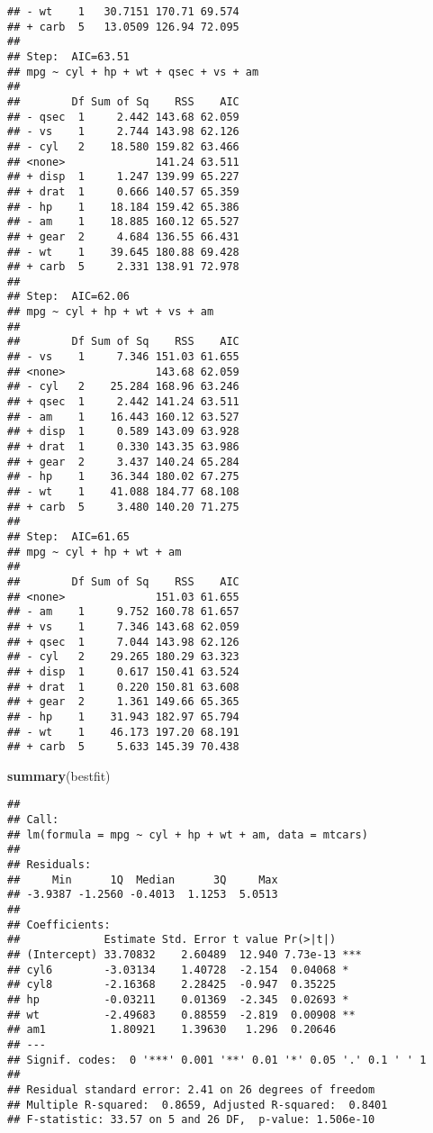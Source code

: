 \documentclass[
]{article}
\newenvironment{Shaded}{\begin{snugshade}}{\end{snugshade}}
\newcommand{\KeywordTok}[1]{\textcolor[rgb]{0.13,0.29,0.53}{\textbf{#1}}}
\newcommand{\NormalTok}[1]{#1}
\begin{document}
\begin{verbatim}
## - wt    1   30.7151 170.71 69.574
## + carb  5   13.0509 126.94 72.095
## 
## Step:  AIC=63.51
## mpg ~ cyl + hp + wt + qsec + vs + am
## 
##        Df Sum of Sq    RSS    AIC
## - qsec  1     2.442 143.68 62.059
## - vs    1     2.744 143.98 62.126
## - cyl   2    18.580 159.82 63.466
## <none>              141.24 63.511
## + disp  1     1.247 139.99 65.227
## + drat  1     0.666 140.57 65.359
## - hp    1    18.184 159.42 65.386
## - am    1    18.885 160.12 65.527
## + gear  2     4.684 136.55 66.431
## - wt    1    39.645 180.88 69.428
## + carb  5     2.331 138.91 72.978
## 
## Step:  AIC=62.06
## mpg ~ cyl + hp + wt + vs + am
## 
##        Df Sum of Sq    RSS    AIC
## - vs    1     7.346 151.03 61.655
## <none>              143.68 62.059
## - cyl   2    25.284 168.96 63.246
## + qsec  1     2.442 141.24 63.511
## - am    1    16.443 160.12 63.527
## + disp  1     0.589 143.09 63.928
## + drat  1     0.330 143.35 63.986
## + gear  2     3.437 140.24 65.284
## - hp    1    36.344 180.02 67.275
## - wt    1    41.088 184.77 68.108
## + carb  5     3.480 140.20 71.275
## 
## Step:  AIC=61.65
## mpg ~ cyl + hp + wt + am
## 
##        Df Sum of Sq    RSS    AIC
## <none>              151.03 61.655
## - am    1     9.752 160.78 61.657
## + vs    1     7.346 143.68 62.059
## + qsec  1     7.044 143.98 62.126
## - cyl   2    29.265 180.29 63.323
## + disp  1     0.617 150.41 63.524
## + drat  1     0.220 150.81 63.608
## + gear  2     1.361 149.66 65.365
## - hp    1    31.943 182.97 65.794
## - wt    1    46.173 197.20 68.191
## + carb  5     5.633 145.39 70.438
\end{verbatim}

\begin{Shaded}
\begin{Highlighting}[]
\KeywordTok{summary}\NormalTok{(bestfit)}
\end{Highlighting}
\end{Shaded}

\begin{verbatim}
## 
## Call:
## lm(formula = mpg ~ cyl + hp + wt + am, data = mtcars)
## 
## Residuals:
##     Min      1Q  Median      3Q     Max 
## -3.9387 -1.2560 -0.4013  1.1253  5.0513 
## 
## Coefficients:
##             Estimate Std. Error t value Pr(>|t|)    
## (Intercept) 33.70832    2.60489  12.940 7.73e-13 ***
## cyl6        -3.03134    1.40728  -2.154  0.04068 *  
## cyl8        -2.16368    2.28425  -0.947  0.35225    
## hp          -0.03211    0.01369  -2.345  0.02693 *  
## wt          -2.49683    0.88559  -2.819  0.00908 ** 
## am1          1.80921    1.39630   1.296  0.20646    
## ---
## Signif. codes:  0 '***' 0.001 '**' 0.01 '*' 0.05 '.' 0.1 ' ' 1
## 
## Residual standard error: 2.41 on 26 degrees of freedom
## Multiple R-squared:  0.8659, Adjusted R-squared:  0.8401 
## F-statistic: 33.57 on 5 and 26 DF,  p-value: 1.506e-10
\end{verbatim}
\end{document}
